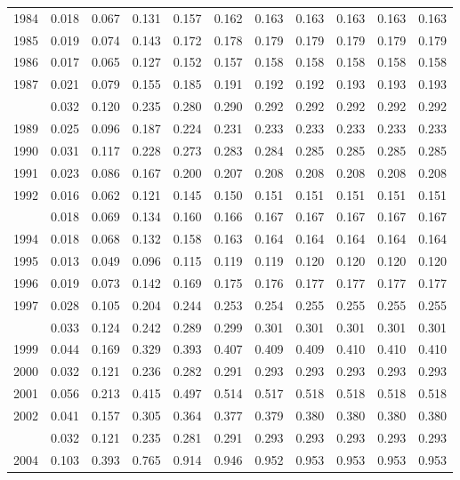 \documentclass[
]{article}
\begin{document}
\begin{longtable}[t]{lrrrrrrrrrr}
1984 & 0.018 & 0.067 & 0.131 & 0.157 & 0.162 & 0.163 & 0.163 & 0.163 & 0.163 & 0.163\\
1985 & 0.019 & 0.074 & 0.143 & 0.172 & 0.178 & 0.179 & 0.179 & 0.179 & 0.179 & 0.179\\
1986 & 0.017 & 0.065 & 0.127 & 0.152 & 0.157 & 0.158 & 0.158 & 0.158 & 0.158 & 0.158\\
1987 & 0.021 & 0.079 & 0.155 & 0.185 & 0.191 & 0.192 & 0.192 & 0.193 & 0.193 & 0.193\\
\addlinespace
1988 & 0.032 & 0.120 & 0.235 & 0.280 & 0.290 & 0.292 & 0.292 & 0.292 & 0.292 & 0.292\\
1989 & 0.025 & 0.096 & 0.187 & 0.224 & 0.231 & 0.233 & 0.233 & 0.233 & 0.233 & 0.233\\
1990 & 0.031 & 0.117 & 0.228 & 0.273 & 0.283 & 0.284 & 0.285 & 0.285 & 0.285 & 0.285\\
1991 & 0.023 & 0.086 & 0.167 & 0.200 & 0.207 & 0.208 & 0.208 & 0.208 & 0.208 & 0.208\\
1992 & 0.016 & 0.062 & 0.121 & 0.145 & 0.150 & 0.151 & 0.151 & 0.151 & 0.151 & 0.151\\
\addlinespace
1993 & 0.018 & 0.069 & 0.134 & 0.160 & 0.166 & 0.167 & 0.167 & 0.167 & 0.167 & 0.167\\
1994 & 0.018 & 0.068 & 0.132 & 0.158 & 0.163 & 0.164 & 0.164 & 0.164 & 0.164 & 0.164\\
1995 & 0.013 & 0.049 & 0.096 & 0.115 & 0.119 & 0.119 & 0.120 & 0.120 & 0.120 & 0.120\\
1996 & 0.019 & 0.073 & 0.142 & 0.169 & 0.175 & 0.176 & 0.177 & 0.177 & 0.177 & 0.177\\
1997 & 0.028 & 0.105 & 0.204 & 0.244 & 0.253 & 0.254 & 0.255 & 0.255 & 0.255 & 0.255\\
\addlinespace
1998 & 0.033 & 0.124 & 0.242 & 0.289 & 0.299 & 0.301 & 0.301 & 0.301 & 0.301 & 0.301\\
1999 & 0.044 & 0.169 & 0.329 & 0.393 & 0.407 & 0.409 & 0.409 & 0.410 & 0.410 & 0.410\\
2000 & 0.032 & 0.121 & 0.236 & 0.282 & 0.291 & 0.293 & 0.293 & 0.293 & 0.293 & 0.293\\
2001 & 0.056 & 0.213 & 0.415 & 0.497 & 0.514 & 0.517 & 0.518 & 0.518 & 0.518 & 0.518\\
2002 & 0.041 & 0.157 & 0.305 & 0.364 & 0.377 & 0.379 & 0.380 & 0.380 & 0.380 & 0.380\\
\addlinespace
2003 & 0.032 & 0.121 & 0.235 & 0.281 & 0.291 & 0.293 & 0.293 & 0.293 & 0.293 & 0.293\\
2004 & 0.103 & 0.393 & 0.765 & 0.914 & 0.946 & 0.952 & 0.953 & 0.953 & 0.953 & 0.953\\

\end{longtable}
\end{document}

